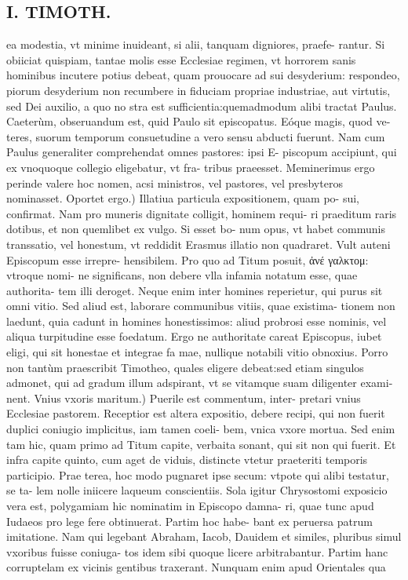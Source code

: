 \documentclass{article}
\begin{document}
\begin{pages}
\section*{I. TIMOTH. }
\marginpar{[ p.32]}\pstart ea modestia, vt minime inuideant, si alii, tanquam digniores, praefe- rantur. Si obiiciat quispiam, tantae molis esse Ecclesiae regimen, vt horrorem sanis hominibus incutere potius debeat, quam prouocare ad sui desyderium: respondeo, piorum desyderium non recumbere in fiduciam propriae industriae, aut virtutis, sed Dei auxilio, a quo no stra est sufficientia:quemadmodum alibi tractat Paulus. Caeterùm, obseruandum est, quid Paulo sit episcopatus. Eóque magis, quod ve- teres, suorum temporum consuetudine a vero sensu abducti fuerunt. Nam cum Paulus generaliter comprehendat omnes pastores: ipsi E- piscopum accipiunt, qui ex vnoquoque collegio eligebatur, vt fra- tribus praeesset. Meminerimus ergo perinde valere hoc nomen, acsi ministros, vel pastores, vel presbyteros nominasset.  \pend\pstart Oportet ergo.) Illatiua particula expositionem, quam po- sui, confirmat. Nam pro muneris dignitate colligit, hominem requi- ri praeditum raris dotibus, et non quemlibet ex vulgo. Si esset bo- num opus, vt habet communis transsatio, vel honestum, vt reddidit Erasmus illatio non quadraret. Vult auteni Episcopum esse irrepre- hensibilem. Pro quo ad Titum posuit, ἀνέ γαλκτομ: vtroque nomi- ne significans, non debere vlla infamia notatum esse, quae authorita- tem illi deroget. Neque enim inter homines reperietur, qui purus sit omni vitio. Sed aliud est, laborare communibus vitiis, quae existima- tionem non laedunt, quia cadunt in homines honestissimos: aliud probrosi esse nominis, vel aliqua turpitudine esse foedatum. Ergo ne authoritate careat Episcopus, iubet eligi, qui sit honestae et integrae fa mae, nullique notabili vitio obnoxius. Porro non tantùm praescribit Timotheo, quales eligere debeat:sed etiam singulos admonet, qui ad gradum illum adspirant, vt se vitamque suam diligenter exami- nent.  \pend\pstart Vnius vxoris maritum.) Puerile est commentum, inter- pretari vnius Ecclesiae pastorem. Receptior est altera expositio, debere recipi, qui non fuerit duplici coniugio implicitus, iam tamen coeli- bem, vnica vxore mortua. Sed enim tam hic, quam primo ad Titum capite, verbaita sonant, qui sit non qui fuerit. Et infra capite quinto, cum aget de viduis, distincte vtetur praeteriti temporis participio. Prae terea, hoc modo pugnaret ipse secum: vtpote qui alibi testatur, se ta- lem nolle iniicere laqueum conscientiis. Sola igitur Chrysostomi exposicio vera est, polygamiam hic nominatim in Episcopo damna- ri, quae tunc apud Iudaeos pro lege fere obtinuerat. Partim hoc habe- bant ex peruersa patrum imitatione. Nam qui legebant Abraham, Iacob, Dauidem et similes, pluribus simul vxoribus fuisse coniuga- tos idem sibi quoque licere arbitrabantur. Partim hanc corruptelam ex vicinis gentibus traxerant. Nunquam enim apud Orientales qua  \pend

\end{pages}
\end{document}
